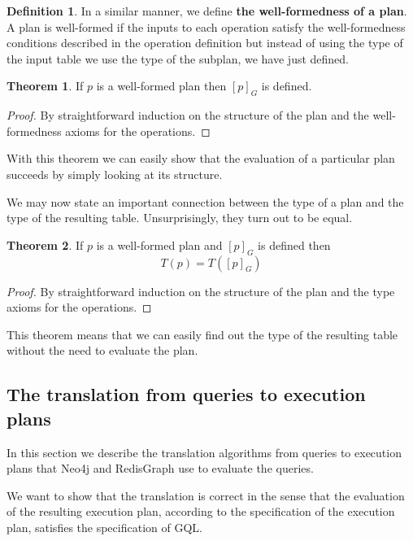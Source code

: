 \documentclass[14pt]{constructor-thesis}
\theoremstyle{definition}
\newtheorem{theorem}{Theorem}
\newtheorem{definition}{Definition}
\begin{document}
\begin{definition}
  In a similar manner, we define \textbf{the well-formedness of a plan}. A plan is well-formed if the inputs to each operation satisfy the well-formedness conditions described in the operation definition but instead of using the type of the input table we use the type of the subplan, we have just defined.
\end{definition}

\begin{theorem}
  If $p$ is a well-formed plan then $[p]_G$ is defined.
\end{theorem}
\begin{proof}
  By straightforward induction on the structure of the plan and the well-formedness axioms for the operations.
\end{proof}

With this theorem we can easily show that the evaluation of a particular plan succeeds by simply looking at its structure.

We may now state an important connection between the type of a plan and the type of the resulting table. Unsurprisingly, they turn out to be equal.

\begin{theorem}
  If $p$ is a well-formed plan and $[p]_G$ is defined then
  $$T(p) = T([p]_G)$$
\end{theorem}
\begin{proof}
  By straightforward induction on the structure of the plan and the type axioms for the operations.
\end{proof}

This theorem means that we can easily find out the type of the resulting table without the need to evaluate the plan.

\subsection{The translation from queries to execution plans}

In this section we describe the translation algorithms from queries to execution plans that Neo4j and RedisGraph use to evaluate the queries.

We want to show that the translation is correct in the sense that the evaluation of the resulting execution plan, according to the specification of the execution plan, satisfies the specification of GQL.

\end{document}
